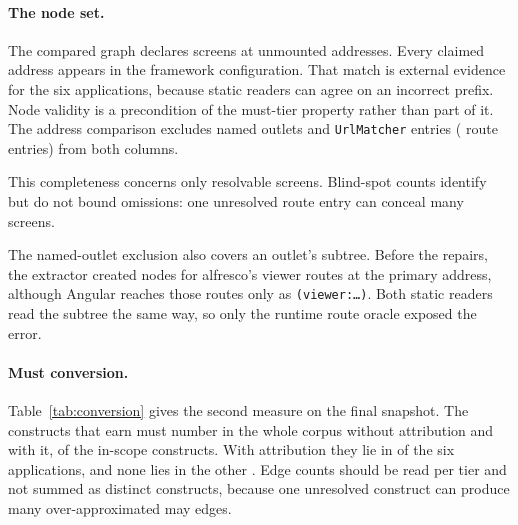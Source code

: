 \paragraph{The node set.} The compared graph declares \ProbeInvented{} screens at unmounted
addresses. Every claimed address appears in the framework configuration. That
match is external evidence for the six applications, because static readers can agree on an
incorrect prefix. Node validity is a precondition of the must-tier property rather than part of it. The address comparison excludes named
outlets and \texttt{UrlMatcher} entries (\ProbeUnaddressableScreens{} route entries) from both columns.

This completeness concerns only resolvable screens. Blind-spot counts identify but do not bound
omissions: one unresolved route entry can conceal many screens.

The named-outlet exclusion also covers an outlet's subtree. Before the repairs, the extractor created
nodes for alfresco's viewer routes at the primary address, although Angular reaches those routes
only as \texttt{(viewer:\ldots)}. Both static readers read the subtree the same way, so only the runtime
route oracle exposed the error.

\begin{table}[t]\footnotesize
\caption{Node extraction against the independent route parser, in both directions.}
\label{tab:coverage}
\TabCoverage
\par{}
\end{table}

\paragraph{Must conversion.} Table~\ref{tab:conversion} gives the second measure on the final snapshot. The constructs that
earn must number \CensusBaseMustSites{} in the whole corpus without attribution and
\CensusMustSites{} with it, \RoundTwoMustConv{} of the in-scope constructs. With attribution they lie in \CensusMustApps{} of the six applications,
and none lies in the other \CensusZeroMustApps{}. Edge counts should be read per tier and not summed as distinct constructs, because one unresolved construct can produce many over-approximated may edges.

